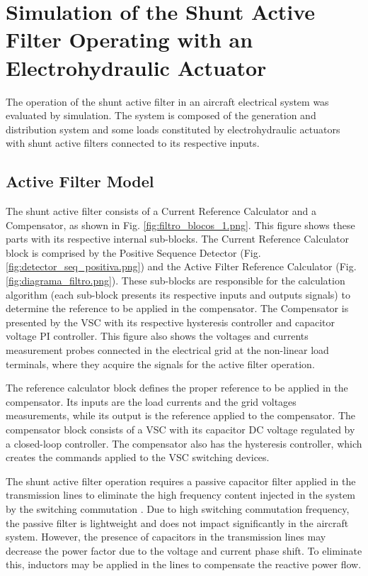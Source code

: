 \section{Simulation of the Shunt Active Filter Operating with an Electrohydraulic Actuator}

The operation of the shunt active filter in an aircraft electrical system was evaluated by simulation. The system is composed of the generation and distribution system and some loads constituted by electrohydraulic actuators with shunt active filters connected to its respective inputs.

\subsection{Active Filter Model}

The shunt active filter consists of a Current Reference Calculator and a Compensator, as shown in Fig. \ref{fig:filtro_blocos_1.png}. This figure shows these parts with its respective internal sub-blocks. The Current Reference Calculator block is comprised by the Positive Sequence Detector (Fig. \ref{fig:detector_seq_positiva.png}) and the Active Filter Reference Calculator (Fig. \ref{fig:diagrama_filtro.png}). These sub-blocks are responsible for the calculation algorithm (each sub-block presents its respective inputs and outputs signals) to determine the reference to be applied in the compensator. The Compensator is presented by the VSC with its respective hysteresis controller and capacitor voltage PI controller. This figure also shows the voltages and currents measurement probes connected in the electrical grid at the non-linear load terminals, where they acquire the signals for the active filter operation.

The reference calculator block defines the proper reference to be applied in the compensator. Its inputs are the load currents and the grid voltages measurements, while its output is the reference applied to the compensator. The compensator block consists of a VSC with its capacitor DC voltage regulated by a closed-loop controller. The compensator also has the hysteresis controller, which creates the commands applied to the VSC switching devices.

The shunt active filter operation requires a passive capacitor filter applied in the transmission lines to eliminate the high frequency content injected in the system by the switching commutation \citep{Akagi2007}. Due to high switching commutation frequency, the passive filter is lightweight and does not impact significantly in the aircraft system. However, the presence of capacitors in the transmission lines may decrease the power factor due to the voltage and current phase shift. To eliminate this, inductors may be applied in the lines to compensate the reactive power flow.

